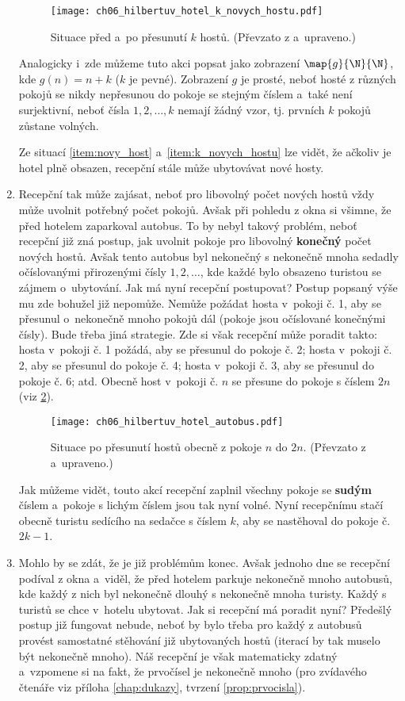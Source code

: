 \begin{enumerate}[label=\textit{(\roman*)}]
    \begin{figure}[h]
        \centering
        \texttt{[image: ch06\_hilbertuv\_hotel\_k\_novych\_hostu.pdf]}
        \caption{Situace před a~po přesunutí $k$ hostů. (Převzato z \cite{Rmoutil2022} a~upraveno.)}
        \label{fig:hilbertuv_hotel_k_novych_hostu}
    \end{figure}
    Analogicky i~zde můžeme tuto akci popsat jako zobrazení $\map{g}{\N}{\N}$, kde $g(n)=n+k$ ($k$ je pevné). Zobrazení $g$ je prosté, neboť hosté z různých pokojů se nikdy nepřesunou do pokoje se stejným číslem a~také není surjektivní, neboť čísla $1,2,\dots,k$ nemají žádný vzor, tj. prvních $k$ pokojů zůstane volných.\par
    Ze situací \ref{item:novy_host} a~\ref{item:k_novych_hostu} lze vidět, že ačkoliv je hotel plně obsazen, recepční stále může ubytovávat nové hosty.
    \item Recepční tak může zajásat, neboť pro libovolný počet nových hostů vždy může uvolnit potřebný počet pokojů. Avšak při pohledu z okna si všimne, že před hotelem zaparkoval autobus. To by nebyl takový problém, neboť recepční již zná postup, jak uvolnit pokoje pro libovolný \textbf{konečný} počet nových hostů. Avšak tento autobus byl nekonečný s nekonečně mnoha sedadly očíslovanými přirozenými čísly $1,2,\dots$, kde každé bylo obsazeno turistou se zájmem o~ubytování. Jak má nyní recepční postupovat? Postup popsaný výše mu zde bohužel již nepomůže. Nemůže požádat hosta v~pokoji č. 1, aby se přesunul o~nekonečně mnoho pokojů dál (pokoje jsou očíslované konečnými čísly). Bude třeba jiná strategie. Zde si však recepční může poradit takto: hosta v~pokoji č. 1 požádá, aby se přesunul do pokoje č. 2; hosta v~pokoji č. 2, aby se přesunul do pokoje č. 4; hosta v~pokoji č. 3, aby se přesunul do pokoje č. 6; atd. Obecně host v~pokoji č. $n$ se přesune do pokoje s číslem $2n$ (viz \ref{fig:hilbertuv_hotel_autobus}).
    \begin{figure}[h]
        \centering
        \texttt{[image: ch06\_hilbertuv\_hotel\_autobus.pdf]}
        \caption{Situace po přesunutí hostů obecně z pokoje $n$ do $2n$. (Převzato z \cite{Rmoutil2022} a~upraveno.)}
        \label{fig:hilbertuv_hotel_autobus}
    \end{figure}
    Jak můžeme vidět, touto akcí recepční zaplnil všechny pokoje se \textbf{sudým} číslem a~pokoje s lichým číslem jsou tak nyní volné. Nyní recepčnímu stačí obecně turistu sedícího na sedačce s číslem $k$, aby se nastěhoval do pokoje č. $2k-1$.
    \item Mohlo by se zdát, že je již problémům konec. Avšak jednoho dne se recepční podíval z okna a~viděl, že před hotelem parkuje nekonečně mnoho autobusů, kde každý z nich byl nekonečně dlouhý s nekonečně mnoha turisty. Každý s turistů se chce v~hotelu ubytovat. Jak si recepční má poradit nyní? Předešlý postup již fungovat nebude, neboť by bylo třeba pro každý z autobusů provést samostatné stěhování již ubytovaných hostů (iterací by tak muselo být nekonečně mnoho). Náš recepční je však matematicky zdatný a~vzpomene si na fakt, že prvočísel je nekonečně mnoho (pro zvídavého čtenáře viz příloha \ref{chap:dukazy}, tvrzení \ref{prop:prvocisla}).

\end{enumerate}
